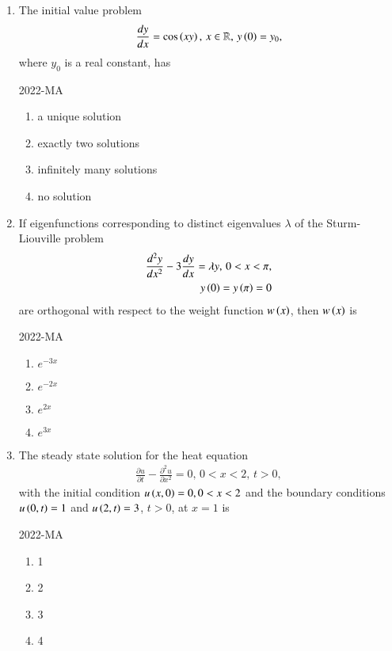 \documentclass[journal,12pt,onecolumn]{IEEEtran}
\theoremstyle{remark}
\begin{document}
\begin{enumerate}
\item The initial value problem 
	\begin{align*}
		\frac{dy}{dx}= \cos \left(xy\right), \, x \in \mathbb{R}, \, y\left(0\right) =y_0,
	\end{align*}
 where $y_0$ is a real constant, has

\hfill{2022-MA}


 	\begin{enumerate}
		\item a unique solution
		\item exactly two solutions
		\item infinitely many solutions
		\item no solution
	\end{enumerate}

\item If eigenfunctions corresponding to distinct eigenvalues $\lambda$ of the Sturm-Liouville problem 
	\begin{align*}
		\frac{d^2 y}{dx^2}-3\frac{dy}{dx}= \lambda y, \, 0<x<\pi, \\
		y\left(0\right)=y\left(\pi\right)=0
	\end{align*}
are orthogonal with respect to the weight function $w\left(x\right)$, then $w\left(x\right)$ is

\hfill{2022-MA}

	\begin{enumerate}
		\item $e^{-3x}$
		\item $e^{-2x}$
		\item $e^{2x}$
		\item $e^{3x}$
	\end{enumerate}

\item The steady state solution for the heat equation
	\begin{align*}
		\frac{\partial u}{\partial t}-\frac{\partial^2 u}{\partial x^2}=0, \, 0<x<2, \, t>0,
	\end{align*}
	with the initial condition $u\left(x,0\right)=0, 0<x<2$ and the boundary conditions $u\left(0,t\right)=1$ and $u\left(2,t\right)=3$, $t>0$, at $x=1$ is
	
	\hfill{2022-MA}


	\begin{enumerate}
		\item 1
		\item 2
		\item 3
		\item 4
	\end{enumerate}


\end{enumerate}
\end{document}
